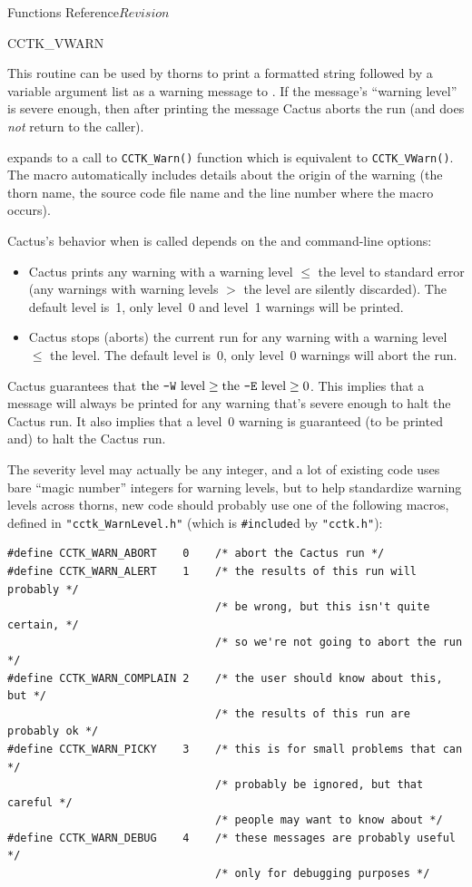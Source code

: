 \begin{cactuspart}{ Functions Reference}{}{$Revision$}
\begin{FunctionDescription}{CCTK\_VWARN}
\begin{Discussion}
This routine can be used by thorns to print a formatted string followed
by a variable argument list as a warning message to .  If
the message's ``warning level'' is severe enough, then after printing
the message Cactus aborts the run (and  does {\em not\/}
return to the caller).

 expands to a call to \verb|CCTK_Warn()|
function which is equivalent to \verb|CCTK_VWarn()|.
The macro automatically includes details about the origin of the warning
(the thorn name, the source code file name and the line number where the macro
occurs).

Cactus's behavior when  is called depends on the
 and  command-line options:
\begin{itemize}
\item   Cactus prints any warning with a warning level $\le$
        the  level to standard error (any warnings with
        warning levels $>$ the  level are silently discarded).
        The default  level is~1, \ie{} only level~0 and level~1
        warnings will be printed.
\item   Cactus stops (aborts) the current run for any warning
        with a warning level $\le$ the  level.
        The default  level is~0, \ie{} only level~0
        warnings will abort the run.
\end{itemize}

Cactus guarantees that
$\mbox{the \mbox{\texttt{-W}}~level} \ge \mbox{the \mbox{\texttt{-E}}~level} \ge 0$.
This implies that a message will always be printed for any warning that's
severe enough to halt the Cactus run.  It also implies that a level~0
warning is guaranteed (to be printed and) to halt the Cactus run.

The severity level may actually be any integer, and a lot of existing
code uses bare ``magic number'' integers for warning levels, but to
help standardize warning levels across thorns, new code should probably
use one of the following macros, defined in \verb|"cctk_WarnLevel.h"|
(which is \verb|#include|d by \verb|"cctk.h"|):
\begin{verbatim}
#define CCTK_WARN_ABORT    0    /* abort the Cactus run */
#define CCTK_WARN_ALERT    1    /* the results of this run will probably */
                                /* be wrong, but this isn't quite certain, */
                                /* so we're not going to abort the run */
#define CCTK_WARN_COMPLAIN 2    /* the user should know about this, but */
                                /* the results of this run are probably ok */
#define CCTK_WARN_PICKY    3    /* this is for small problems that can */
                                /* probably be ignored, but that careful */
                                /* people may want to know about */
#define CCTK_WARN_DEBUG    4    /* these messages are probably useful */
                                /* only for debugging purposes */
\end{verbatim}


\end{Discussion}
\end{FunctionDescription}
\end{cactuspart}
